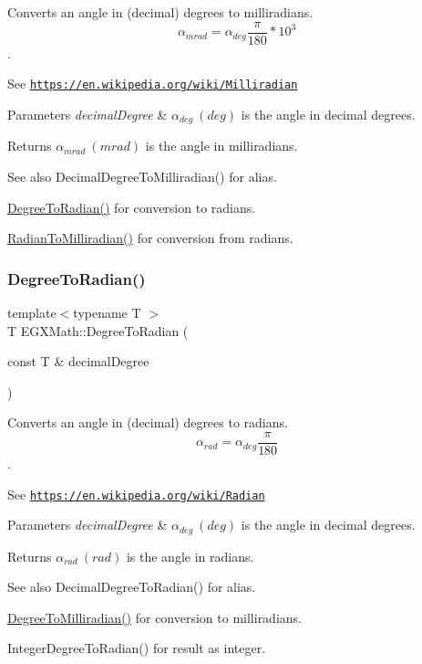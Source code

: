 Converts an angle in (decimal) degrees to milliradians. \[\alpha_{mrad}=\alpha_{deg}\frac{\pi}{180}*10^3\]. 

See \href{https://en.wikipedia.org/wiki/Milliradian}{\tt https\+://en.\+wikipedia.\+org/wiki/\+Milliradian} 
\begin{DoxyParams}{Parameters}
{\em decimal\+Degree} & $\alpha_{deg}\ (deg)$ is the angle in decimal degrees. \\
\hline
\end{DoxyParams}
\begin{DoxyReturn}{Returns}
$\alpha_{mrad}\ (mrad)$ is the angle in milliradians. 
\end{DoxyReturn}
\begin{DoxySeeAlso}{See also}
Decimal\+Degree\+To\+Milliradian() for alias. 

\mbox{\hyperlink{group___e_g_x_math-_angle_conversions-_degree_ga48585541b228c852c9d08a9eac3682f0}{Degree\+To\+Radian()}} for conversion to radians. 

\mbox{\hyperlink{group___e_g_x_math-_angle_conversions-_radian_gaea391f0cca39b05e298dd1cae162e7f1}{Radian\+To\+Milliradian()}} for conversion from radians. 
\end{DoxySeeAlso}
\mbox{\label{group___e_g_x_math-_angle_conversions-_degree_ga48585541b228c852c9d08a9eac3682f0}} 
\subsubsection{\texorpdfstring{Degree\+To\+Radian()}{DegreeToRadian()}}
{\footnotesize\ttfamily template$<$typename T $>$ \\
T E\+G\+X\+Math\+::\+Degree\+To\+Radian (\begin{DoxyParamCaption}\item[{const T \&}]{decimal\+Degree }\end{DoxyParamCaption})}



Converts an angle in (decimal) degrees to radians. \[\alpha_{rad}=\alpha_{deg}\frac{\pi}{180}\]. 

See \href{https://en.wikipedia.org/wiki/Radian}{\tt https\+://en.\+wikipedia.\+org/wiki/\+Radian} 
\begin{DoxyParams}{Parameters}
{\em decimal\+Degree} & $\alpha_{deg}\ (deg)$ is the angle in decimal degrees. \\
\hline
\end{DoxyParams}
\begin{DoxyReturn}{Returns}
$\alpha_{rad}\ (rad)$ is the angle in radians. 
\end{DoxyReturn}
\begin{DoxySeeAlso}{See also}
Decimal\+Degree\+To\+Radian() for alias. 

\mbox{\hyperlink{group___e_g_x_math-_angle_conversions-_degree_gae4fa6c2d3805430760783650cfbfdb11}{Degree\+To\+Milliradian()}} for conversion to milliradians. 

Integer\+Degree\+To\+Radian() for result as integer. 
\end{DoxySeeAlso}
